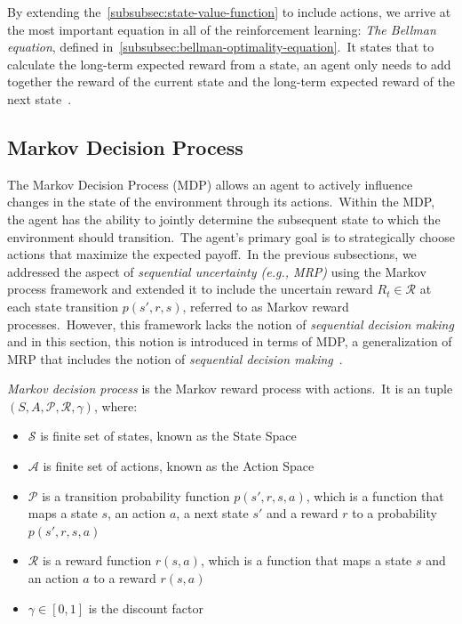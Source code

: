 \documentclass[../xlapes02]{subfiles}
\begin{document}
    By extending the~\cref{subsubsec:state-value-function} to include actions, we arrive at the most important equation in all of the reinforcement learning: \emph{The Bellman equation}, defined in~\cref{subsubsec:bellman-optimality-equation}.\ It states that to calculate the long-term expected reward from a state, an agent only needs to add together the reward of the current state and the long-term expected reward of the next state~\cite{FITMT25127}.

    \subsection{Markov Decision Process}\label{subsec:markov-decision-process}
    The Markov Decision Process (MDP) allows an agent to actively influence changes in the state of the environment through its actions.\ Within the MDP, the agent has the ability to jointly determine the subsequent state to which the environment should transition.\ The agent's primary goal is to strategically choose actions that maximize the expected payoff.\ In the previous subsections, we addressed the aspect of \emph{sequential uncertainty (e.g., MRP)} using the Markov process framework and extended it to include the uncertain reward $R_t\in\mathcal{R}$ at each state transition $p(s',r,s)$, referred to as Markov reward processes.\ However, this framework lacks the notion of \emph{sequential decision making} and in this section, this notion is introduced in terms of MDP, a generalization of MRP that includes the notion of \emph{sequential decision making}~\cite{rao2022foundations}.
%
    \begin{definition}
        \emph{Markov decision process} is the Markov reward process with actions.\ It is an tuple $(S,A,\mathcal{P},\mathcal{R},\gamma)$, where:
        \begin{itemize}
            \item $\mathcal{S}$ is finite set of states, known as the State Space
            \item $\mathcal{A}$ is finite set of actions, known as the Action Space
            \item $\mathcal{P}$ is a transition probability function $p(s',r,s,a)$, which is a function that maps a state $s$, an action $a$, a next state $s'$ and a reward $r$ to a probability $p(s',r,s,a)$
            \item $\mathcal{R}$ is a reward function $r(s,a)$, which is a function that maps a state $s$ and an action $a$ to a reward $r(s,a)$
            \item $\gamma\in[0,1]$ is the discount factor
        \end{itemize}
    \end{definition}
\end{document}
